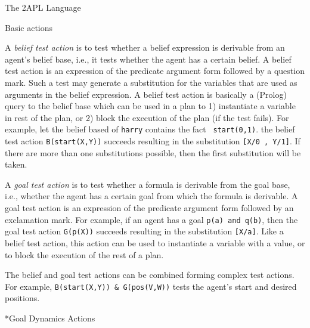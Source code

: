 \begin{chapter}{The 2APL Language}
\begin{section}{Basic actions}
\begin{subsection}
A \emph{belief test action} is to test whether a belief expression
is derivable from an agent's belief base, i.e., it tests whether the
agent has a certain belief. A belief test action  is
an expression of the predicate argument form followed by a question
mark. Such a test may generate a substitution for the variables that
are used as arguments in the belief expression. A belief test action
is basically a (Prolog) query to the belief base which can be used
in a plan to 1) instantiate a variable in rest of the plan, or 2)
block the execution of the plan (if the test fails). For example,
let the belief based of {\tt harry} contains the fact {\tt
start(0,1)}. the belief test action {\tt B(start(X,Y))} succeeds
resulting in the substitution {\tt [X/0 , Y/1]}. If there are more
than one substitutions possible, then the first substitution will be
taken.

A \emph{goal test action} is to test whether a formula is derivable
from the goal base, i.e., whether the agent has a certain goal from
which the formula is derivable. A goal test action  is
an expression of the predicate argument form followed by an
exclamation mark. For example, if an agent has a goal {\tt p(a) and
q(b)}, then the goal test action {\tt G(p(X))} succeeds resulting in
the substitution {\tt [X/a]}. Like a belief test action, this action
can be used to instantiate a variable with a value, or to block the
execution of the rest of a plan.

The belief and goal test actions can be combined forming complex
test actions. For example, {\tt B(start(X,Y)) \& G(pos(V,W))} tests
the agent's start and desired positions.
\end{subsection}

\begin{subsection}*{Goal Dynamics Actions}\label{sec:goaldyn}


\end{subsection}
\end{section}
\end{chapter}
